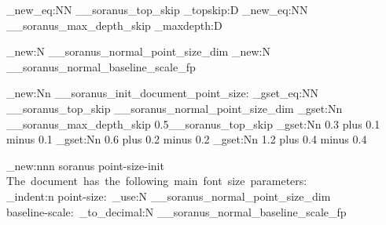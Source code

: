 %
%
%
% 
%

%

%

\cs_new_eq:NN \g__soranus_top_skip \tex_topskip:D
\cs_new_eq:NN \g__soranus_max_depth_skip \tex_maxdepth:D

\dim_new:N \g__soranus_normal_point_size_dim
\fp_new:N \g__soranus_normal_baseline_scale_fp


%

\cs_new:Nn \__soranus_init_document_point_size:
  {
    \dim_gset_eq:NN \g__soranus_top_skip \g__soranus_normal_point_size_dim
    \dim_gset:Nn \g__soranus_max_depth_skip { 0.5\g__soranus_top_skip }
    \skip_gset:Nn \smallskipamount
      {
         { 0.3 }
        plus  { 0.1 }
        minus  { 0.1 }
      }
    \skip_gset:Nn \medskipamount
      {
         { 0.6 }
        plus  { 0.2 }
        minus  { 0.2 }
      }
    \skip_gset:Nn \bigskipamount
      {
         { 1.2 }
        plus  { 0.4 }
        minus  { 0.4 }
      }
  }


%

\msg_new:nnn { soranus } { point-size-init }
  {
    The~document~has~the~following~main~font~size~parameters:\\
    \iow_indent:n
      {
        point-size:~\dim_use:N \g__soranus_normal_point_size_dim\\
        baseline-scale:~\fp_to_decimal:N \g__soranus_normal_baseline_scale_fp
      }
  }

